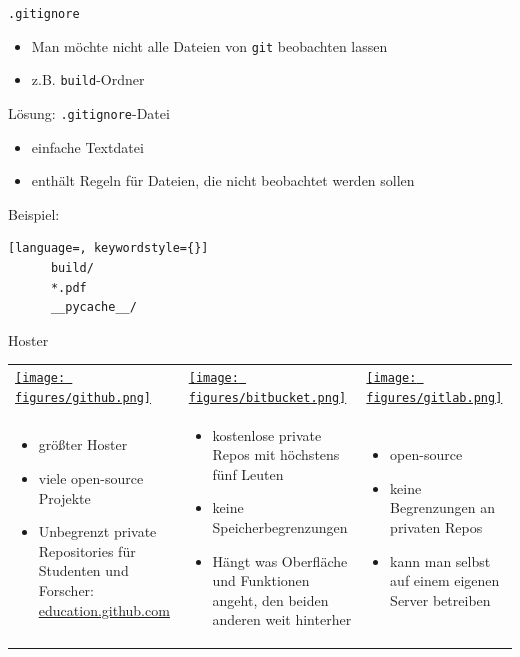 \begin{frame}[fragile]{\texttt{.gitignore}}
    \begin{itemize}
    \item Man möchte nicht alle Dateien von \texttt{git} beobachten lassen
    \item z.B. \texttt{build}-Ordner
    \end{itemize}
    \begin{center}
        \Large Lösung: \texttt{.gitignore}-Datei
    \end{center}

    \begin{itemize}
    \item einfache Textdatei
    \item enthält Regeln für Dateien, die nicht beobachtet werden sollen
    \end{itemize}
    Beispiel:
    \vspace{1em}
    \begin{lstlisting}[language=, keywordstyle={}]
      build/
      *.pdf
      __pycache__/
    \end{lstlisting}
\end{frame}

\begin{frame}{Hoster}
  \begin{tabu}{@{} X[,C] @{} X[,C] @{} X[,C] @{}}
    \href{https://github.com}{\texttt{[image: figures/github.png]}} &
    \href{https://bitbucket.org}{\texttt{[image: figures/bitbucket.png]}} &
    \href{https://gitlab.com}{\texttt{[image: figures/gitlab.png]}} \\
    \begin{itemize}
      \item größter Hoster
      \item viele open-source Projekte
      \item Unbegrenzt private Repositories für Studenten und Forscher:  \newline
        \href{http://education.github.com}{education.github.com}
    \end{itemize}
    &
    \begin{itemize}
      \item kostenlose private Repos mit höchstens fünf Leuten
      \item keine Speicherbegrenzungen
      \item Hängt was Oberfläche und Funktionen angeht, den beiden anderen weit hinterher
    \end{itemize}
    &
    \begin{itemize}
      \item open-source
      \item keine Begrenzungen an privaten Repos
      \item kann man selbst auf einem eigenen Server betreiben
    \end{itemize}
  \end{tabu}
  \begin{center}
  \end{center}
\end{frame}

